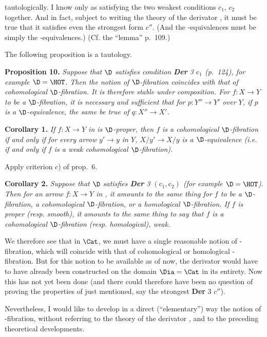 tautologically. I know only \HOT{} as satisfying the two weakest conditions $c_1$, $c_2$ together. And in fact, subject to writing the theory of the derivator \HOT, it must be true that it satisfies even the strongest form $c''$. (And the \HOT-equivalences must be simply the \Hot-equivalences.) (Cf. the ``lemma'' p.~109.)

The following proposition is a tautology.

\noindent\textbf{Proposition 10.} \textit{Suppose that $\D$ satisfies condition \textup{\textbf{Der} 3 $\mathrm{c}_1$ (p.~124),} for example $\D = \text{\HOT}$. Then the notion of $\D$-fibration coincides with that of cohomological $\D$-fibration. It is therefore stable under composition. For $f : X \to Y$ to be a $\D$-fibration, it is necessary and sufficient that for $p : Y'' \to Y'$ over $Y$, if $p$ is a $\D$-equivalence, the same be true of $q : X'' \to X'$.}

\noindent\textbf{Corollary 1.} \textit{If $f : X \to Y$ in \textup{\Dia} is $\D$-proper, then $f$ is a cohomological $\D$-fibration if and only if for every arrow $y' \to y$ in $Y$, $X/y' \to X/y$ is a $\D$-equivalence \textup{(i.e.} if and only if $f$ is a weak cohomological $\D$-fibration\textup{).}}

Apply criterion $c$) of prop.~6.


\noindent\textbf{Corollary 2.} \textit{Suppose that $\D$ satisfies \textup{\textbf{Der} 3 $(\mathrm{c}_1, \mathrm{c}_2)$ (for example $\D = \text{\HOT}$).} Then for an arrow $f : X \to Y$ in \textup{\Dia}, it amounts to the same thing for $f$ to be a $\D$-fibration, a cohomological $\D$-fibration, or a homological $\D$-fibration. If $f$ is proper \textup{(resp.} smooth\textup{),} it amounts to the same thing to say that $f$ is a cohomological $\D$-fibration \textup{(resp.} homological\textup{),} weak.}

We therefore see that in $\Cat$, we must have a single reasonable notion of \HOT-fibration, which will coincide with that of cohomological or homological \HOT-fibration. But for this notion to be available as of now, the derivator \HOT{} would have to have already been constructed on the domain $\text{\Dia} = \Cat$ in its entirety. Now this has not yet been done (and there could therefore have been no question of proving the properties of \HOT{} just mentioned, say the strongest \textbf{Der} 3 $c''$).

Nevertheless, I would like to develop in a direct (``elementary'') way the notion of \Hot-fibration, without referring to the theory of the derivator \HOT, and to the preceding theoretical developments. %
